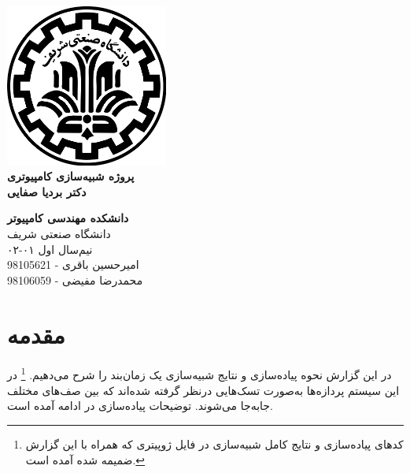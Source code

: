 \documentclass{article}
\begin{document}
\begin{titlepage}
	\begin{center}
		\vspace{0.2cm}
		
		\includegraphics[width=0.4\textwidth]{sharif.png}\\
		\vspace{0.5cm}
		\textbf{ \Huge{پروژه شبیه‌سازی کامپیوتری}}\\
		\vspace{0.25cm}
		\textbf{ \Large{دکتر بردیا صفایی}}
		\vspace{0.2cm}
		
		
		\large \textbf{دانشکده مهندسی کامپیوتر}\\\vspace{0.1cm}
		\large   دانشگاه صنعتی شریف\\\vspace{0.2cm}
		\large   ﻧﯿﻢ‌سال اول ۰۱-۰۲ \\\vspace{0.2cm}
		\large{\Large{امیرحسین باقری - 98105621}}\\
		\large{\Large{محمدرضا مفیضی - 98106059}}\\
	\end{center}
\end{titlepage}

\pagestyle{fancy}
\fancyhf{}
\fancyfoot{}
\setlength{\headheight}{59pt}
\cfoot{\thepage}

\section{مقدمه}
در این گزارش نحوه پیاده‌سازی و نتایج شبیه‌سازی یک زمان‌بند  را شرح می‌دهیم. \footnote{کدهای پیاده‌سازی و نتایج کامل شبیه‌سازی در فایل ژوپیتری که همراه با این گزارش ضمیمه شده آمده است.}
در این سیستم پردازه‌ها به‌صورت تسک‌هایی درنظر گرفته شده‌اند که بین صف‌های مختلف جابه‌جا می‌شوند.
توضیحات پیاده‌سازی در ادامه آمده است.
\end{document}
